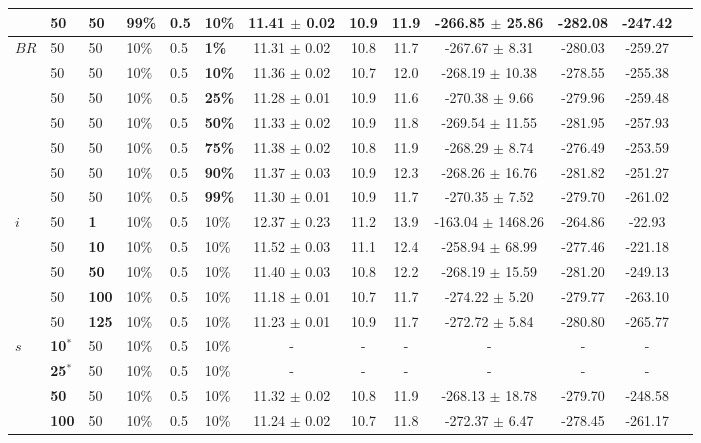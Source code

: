 \begin{sidewaystable}
\begin{tabular}{|l|l|l|l|l|l||c|c|c|c|c|c|c|}
    ~ & 50 & 50 & \textbf{99\%} & 0.5 & 10\% & 11.41 $\pm$ 0.02 & 10.9 & 11.9 & -266.85 $\pm$ 25.86 & -282.08 & -247.42  \\
    \hline
    $BR$ & 50 & 50 & 10\% & 0.5 & \textbf{1\%} & 11.31 $\pm$ 0.02 & 10.8 & 11.7 & -267.67 $\pm$ 8.31 & -280.03 & -259.27 \\
    ~    & 50 & 50 & 10\% & 0.5 & \textbf{10\%} & 11.36 $\pm$ 0.02 & 10.7 & 12.0 & -268.19 $\pm$ 10.38 & -278.55 & -255.38 \\
    ~    & 50 & 50 & 10\% & 0.5 & \textbf{25\%} & 11.28 $\pm$ 0.01 & 10.9 & 11.6 & -270.38 $\pm$ 9.66 & -279.96 & -259.48 \\
    ~    & 50 & 50 & 10\% & 0.5 & \textbf{50\%} & 11.33 $\pm$ 0.02 & 10.9 & 11.8 & -269.54 $\pm$ 11.55 & -281.95 & -257.93 \\
    ~    & 50 & 50 & 10\% & 0.5 & \textbf{75\%} & 11.38 $\pm$ 0.02 & 10.8 & 11.9 & -268.29 $\pm$ 8.74 & -276.49 & -253.59 \\
    ~    & 50 & 50 & 10\% & 0.5 & \textbf{90\%} & 11.37 $\pm$ 0.03 & 10.9 & 12.3 & -268.26 $\pm$ 16.76 & -281.82 & -251.27 \\
    ~    & 50 & 50 & 10\% & 0.5 & \textbf{99\%} & 11.30 $\pm$ 0.01 & 10.9 & 11.7 & -270.35 $\pm$ 7.52 & -279.70 & -261.02  \\
    \hline
    $i$ & 50 & \textbf{1} & 10\% & 0.5 & 10\% & 12.37 $\pm$ 0.23 & 11.2 & 13.9& -163.04 $\pm$ 1468.26 & -264.86 & -22.93  \\
    ~   & 50 &\textbf{10} & 10\% & 0.5 & 10\% & 11.52 $\pm$ 0.03 & 11.1 & 12.4 & -258.94 $\pm$ 68.99 & -277.46& -221.18 \\
    ~   & 50 &\textbf{50} & 10\% & 0.5 & 10\% & 11.40 $\pm$ 0.03 & 10.8 & 12.2 & -268.19 $\pm$ 15.59 & -281.20 & -249.13 \\
    ~   & 50 &\textbf{100} & 10\% & 0.5 & 10\% & 11.18 $\pm$ 0.01 & 10.7 & 11.7 & -274.22 $\pm$ 5.20 & -279.77 & -263.10 \\
    ~   & 50 &\textbf{125} & 10\% & 0.5 & 10\% & 11.23 $\pm$ 0.01 & 10.9 & 11.7 & -272.72 $\pm$ 5.84 & -280.80 & -265.77  \\
    \hline
    $s$ & \textbf{10$^*$} & 50 & 10\% & 0.5 & 10\% & - & - & - & - & -& - \\
    ~ & \textbf{25$^*$} & 50 & 10\% & 0.5 & 10\% & - & - & - & - & - & -  \\
    ~ & \textbf{50} & 50 & 10\% & 0.5 & 10\% & 11.32 $\pm$ 0.02 & 10.8 & 11.9 & -268.13 $\pm$ 18.78 & -279.70 & -248.58\\
    ~ & \textbf{100} & 50 & 10\% & 0.5 & 10\% & 11.24 $\pm$ 0.02 & 10.7 & 11.8 & -272.37 $\pm$ 6.47 & -278.45 & -261.17\\

\end{tabular}
\end{sidewaystable}
